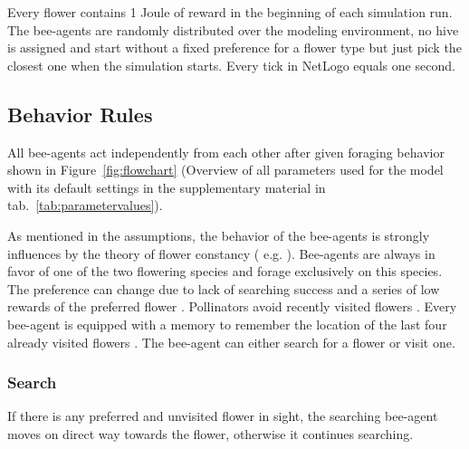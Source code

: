 Every flower contains 1 Joule of reward in the beginning of each simulation run. The bee-agents are randomly distributed over the modeling environment, no hive is assigned and start without a fixed preference for a flower type but just pick the closest one when the simulation starts. Every tick in NetLogo equals one second. 

\subsection*{Behavior Rules}

All bee-agents act independently from each other after given foraging behavior shown in Figure~\ref{fig:flowchart} (Overview of all parameters used for the model with its default settings in the supplementary material in tab.~\ref{tab:parametervalues}).  

As mentioned in the assumptions, the behavior of the bee-agents is strongly influences by the theory of flower constancy ( e.g. \citealp{bobisud1975pollinator, chittka1997foraging, thomson1981field, chittka1999flower,  goulson1994model,  goulson1999foraging}). Bee-agents are always in favor of one of the two flowering species and forage exclusively on this species. The preference can change due to lack of searching success and a series of low rewards of the preferred flower \citep{chittka1997foraging,kunin1993sex,greggers1993memory}. Pollinators avoid recently visited flowers \citep{goulson1999foraging}. Every bee-agent is equipped with a memory to remember the location of the last four already visited flowers \citep{goulson2000pollinators}. The bee-agent can either search for a flower or visit one. 

\subsubsection*{Search}
If there is any preferred and unvisited flower in sight, the searching bee-agent moves on direct way towards the flower, otherwise it continues searching. 

